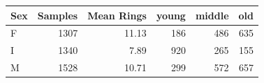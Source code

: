 \begin{tabular}{lrrrrr}
\toprule
Sex & Samples & Mean Rings & young & middle & old \\
\midrule
F & 1307 & 11.13 & 186 & 486 & 635 \\
I & 1340 & 7.89 & 920 & 265 & 155 \\
M & 1528 & 10.71 & 299 & 572 & 657 \\
\bottomrule
\end{tabular}
